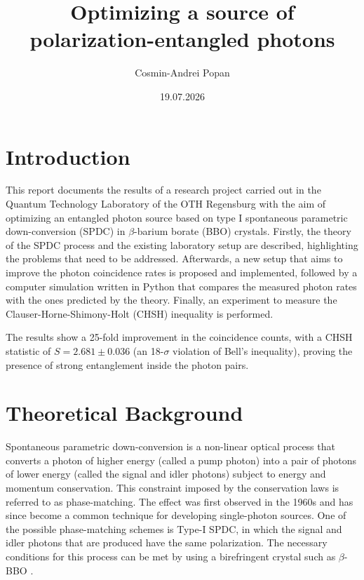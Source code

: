 \documentclass[a4paper,
DIV=13,
12pt,
BCOR=10mm,
department=FakEI,
twoside,
parskip=half,
automark,
logostyle=flat,
]{OTHRartcl}
\date{19.07.2026}
\title{Optimizing a source of polarization-entangled photons}
\author{Cosmin-Andrei Popan}
\begin{document}
\maketitle

\tableofcontents

\cleardoublepage


\section{Introduction}

This report documents the results of a research project carried out in the Quantum Technology Laboratory of the OTH Regensburg with the aim of optimizing an entangled photon source based on type I spontaneous parametric down-conversion (SPDC) in $\beta$-barium borate (BBO) crystals. Firstly, the theory of the SPDC process and the existing laboratory setup are described, highlighting the problems that need to be addressed. Afterwards, a new setup that aims to improve the photon coincidence rates is proposed and implemented, followed by a computer simulation written in Python that compares the measured photon rates with the ones predicted by the theory. Finally, an experiment to measure the Clauser-Horne-Shimony-Holt (CHSH) inequality is performed.

The results show a 25-fold improvement in the coincidence counts, with a CHSH statistic of $S = 2.681 \pm 0.036$ (an 18-$\sigma$ violation of Bell's inequality), proving the presence of strong entanglement inside the photon pairs.




\section{Theoretical Background}

Spontaneous parametric down-conversion is a non-linear optical process that converts a photon of higher energy (called a pump photon) into a pair of photons of lower energy (called the signal and idler photons) subject to energy and momentum conservation. This constraint imposed by the conservation laws is referred to as phase-matching. The effect was first observed in the 1960s and has since become a common technique for developing single-photon sources. One of the possible phase-matching schemes is Type-I SPDC, in which the signal and idler photons that are produced have the same polarization. The necessary conditions for this process can be met by using a birefringent crystal such as $\beta$-BBO \cite{spdc-intensity}.
\end{document}
